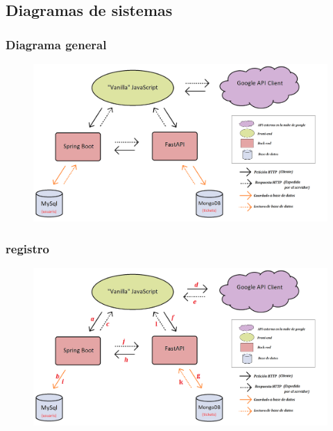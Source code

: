 \documentclass{beamer}
\begin{document}
			
			
			
			
		
		
		
		
		
		
		
		
		\subsection{Diagramas de sistemas}
		
			\begin{frame}
				\frametitle{Diagrama general}
				
				
				\begin{figure}
					\centering
					\includegraphics[width=1\linewidth]{../img/diagramaSistemesAplicacioMercapp}
					
					\label{fig:diagramasistemesaplicaciomercapp}
				\end{figure}
				
			\end{frame}
			
			
			\begin{frame}
				\frametitle{registro}
				
				\begin{figure}
					\centering
					\includegraphics[width=1\linewidth]{../img/diagramaSistemesAplicacioMercappCAMIREGISTREbo}
					
					\label{fig:diagramasistemesaplicaciomercappcamiregistrebo}
				\end{figure}
				
			\end{frame}
			
\end{document}
